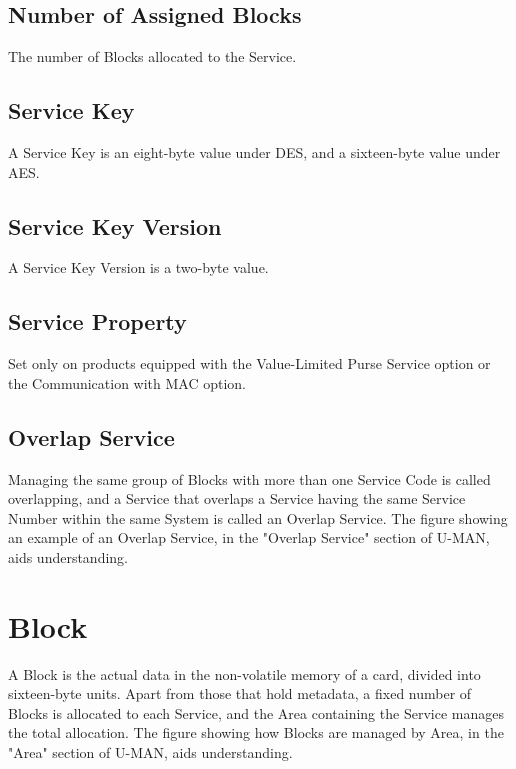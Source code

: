\documentclass[a4paper,11pt]{report}
\begin{document}
\subsection{Number of Assigned Blocks}

The number of Blocks allocated to the Service.

\subsection{Service Key}

A Service Key is an eight-byte value under DES, and a sixteen-byte value under AES.

\subsection{Service Key Version}

A Service Key Version is a two-byte value.

\subsection{Service Property}

Set only on products equipped with the Value-Limited Purse Service option or the Communication with MAC option.

\subsection{Overlap Service}

Managing the same group of Blocks with more than one Service Code is called overlapping, and a Service that overlaps a Service having the same Service Number within the same System is called an Overlap Service. The figure showing an example of an Overlap Service, in the "Overlap Service" section of U-MAN\cite{felica-usersmanual-en}, aids understanding.

\section{Block}

A Block is the actual data in the non-volatile memory of a card, divided into sixteen-byte units. Apart from those that hold metadata, a fixed number of Blocks is allocated to each Service, and the Area containing the Service manages the total allocation. The figure showing how Blocks are managed by Area, in the "Area" section of U-MAN\cite{felica-usersmanual-en}, aids understanding.
\end{document}
